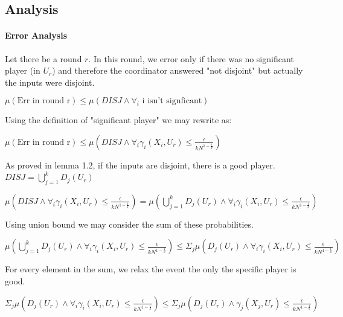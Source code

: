 \documentclass{article}
\theoremstyle{plain}
\begin{document}
\subsection{Analysis}
\paragraph{Error Analysis}
Let there be a round $r$. In this round, we error only if there was no significant player (in $U_r$) and therefore the coordinator answered "not disjoint" but actually the inputs were disjoint. \newline

$\mu(\text{Err in round r}) \leq \mu(DISJ \land \forall_i \text{ i isn't signficant})$ \newline

Using the definition of "significant player" we may rewrite as: \newline

$\mu(\text{Err in round r}) \leq \mu(DISJ \land \forall_i \gamma_i(X_i, U_r) \leq \frac{\epsilon}{kN^{1-\frac{1}{k}}})$ \newline

As proved in lemma 1.2, if the inputs are disjoint, there is a good player. $DISJ = \bigcup_{j = 1}^k D_j(U_r)$ \newline

$ \mu(DISJ \land \forall_i \gamma_i(X_i, U_r) \leq \frac{\epsilon}{kN^{1-\frac{1}{k}}}) = \mu(\bigcup_{j = 1}^k D_j(U_r) \land \forall_i \gamma_i(X_i, U_r) \leq \frac{\epsilon}{kN^{1-\frac{1}{k}}})$ \newline

Using union bound we may consider the sum of these probabilities. \newline

$ \mu(\bigcup_{j = 1}^k D_j(U_r) \land \forall_i \gamma_i(X_i, U_r) \leq \frac{\epsilon}{kN^{1-\frac{1}{k}}}) \leq \Sigma_j \mu(D_j(U_r) \land \forall_i \gamma_i(X_i, U_r) \leq \frac{\epsilon}{kN^{1-\frac{1}{k}}})$ \newline

For every element in the sum, we relax the event the only the specific player is good. \newline

$\Sigma_j \mu(D_j(U_r) \land \forall_i \gamma_i(X_i, U_r) \leq \frac{\epsilon}{kN^{1-\frac{1}{k}}}) \leq \Sigma_j \mu(D_j(U_r) \land \gamma_j(X_j, U_r) \leq \frac{\epsilon}{kN^{1-\frac{1}{k}}})$ \newline
\end{document}
